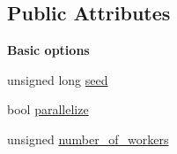 \subsection*{Public Attributes}
\begin{Indent}{\bf Basic options}\par
{\em \label{_amgrp0f569f5975208cc475c7bb42ee13b9a5}
 }\begin{DoxyCompactItemize}
\item 
unsigned long \hyperlink{structeos_1_1PopulationMonteCarloSampler_1_1Config_abf7b1c768e283f8a41bc8b348bb84304}{seed}
\item 
bool \hyperlink{structeos_1_1PopulationMonteCarloSampler_1_1Config_abe02d7abd41f52ae2eaf3eba25522f50}{parallelize}
\item 
unsigned \hyperlink{structeos_1_1PopulationMonteCarloSampler_1_1Config_ae6362a7374c9ca1650b501c07672442a}{number\_\-of\_\-workers}
\end{DoxyCompactItemize}
\end{Indent}
